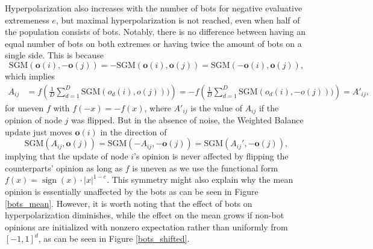 \documentclass[11pt]{article}
\DeclareMathOperator{\sign}{sign}
\begin{document}
Hyperpolarization also increases with the number of bots for negative evaluative extremeness $e$, but maximal hyperpolarization is not reached, even when half of the population consists of bots. Notably, there is no difference between having an equal number of bots on both extremes or having twice the amount of bots on a single side. This is because 
\[\text{SGM}(\textbf{o}(i),-\textbf{o}(j))=-\text{SGM}(\textbf{o}(i),\textbf{o}(j))=\text{SGM}(-\textbf{o}(i),\textbf{o}(j)),\] which implies \begin{align*}
A_{ij}&=f\left(\frac{1}{D}\sum_{d=1}^{D}\text{SGM}(o_{d}(i),o(j)))\right) =-f\left(\frac{1}{D}\sum_{d=1}^{D}\text{SGM}(o_{d}(i),-o(j)))\right)=A'_{ij},
\end{align*} for uneven $f$ with $f(-x)=-f(x)$, where $A'_{ij}$ is the value of $A_{ij}$ if the opinion of node $j$ was flipped. But in the absence of noise, the Weighted Balance update just moves $\textbf{o}(i)$ in the direction of \[
\text{SGM}(A_{ij},\mathbf{o}(j))=\text{SGM}(-A_{ij},-\mathbf{o}(j))=\text{SGM}(A_{ij}',-\mathbf{o}(j)),
\] 
implying that the update of node $i$'s opinion is never affected by flipping the counterparts' opinion as long as $f$ is uneven as we use the functional form $f(x)=\sign(x)\cdot|x|^{1-e}$. This symmetry might also explain why the mean opinion is essentially unaffected by the bots as can be seen in Figure \ref{bots_mean}. However, it is worth noting that the effect of bots on hyperpolarization diminishes, while the effect on the mean grows if non-bot opinions are initialized with nonzero expectation rather than uniformly from $[-1,1]^d$, as can be seen in Figure \ref{bots_shifted}.
\FloatBarrier
\end{document}
